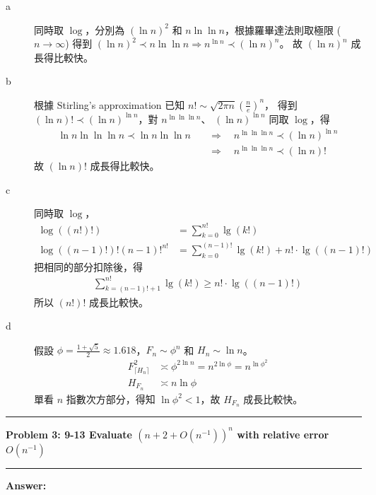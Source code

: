 \documentclass[11pt,fleqn]{article}
\newcommand\question[2]{\vspace{.25in}\hrule\textbf{#1: #2}\vspace{.5em}\hrule\vspace{.10in}}
\renewcommand\part[1]{\vspace{.10in}\textbf{#1}}
\begin{document}
\begin{description}
	\item[a] 同時取 $\log$，分別為 $(\ln n)^2$ 和 $n \ln \ln n$，根據羅畢達法則取極限 
		($n \rightarrow \infty$) 得到 
		$(\ln n)^2 \prec n \ln \ln n \Rightarrow n^{\ln n} \prec (\ln n)^n$。
		故 $(\ln n)^n$ 成長得比較快。
	\item[b] 根據 Stirling's approximation 已知 
		$n! \sim \sqrt{2 \pi n} \left(\frac{n}{e}\right)^n$，
		得到 $(\ln n)! \prec (\ln n)^{\ln n}$，對 $n^{\ln \ln \ln n}$、
		$(\ln n)^{\ln n}$ 同取 $\log$，得 
		\begin{align*}
			\ln n \ln \ln \ln n \prec \ln n \ln \ln n
				\quad &\Rightarrow \quad
			n^{\ln \ln \ln n} \prec (\ln n)^{\ln n} \\
			&\Rightarrow \quad
			n^{\ln \ln \ln n} \prec (\ln n)!
		\end{align*}
		故 $(\ln n)!$ 成長得比較快。
	\item[c] 同時取 $\log$，
		\begin{align*}
			\log ((n!)!) 
				&= \sum\nolimits_{k=0}^{n!} \lg (k!) \\
			\log ((n-1)!)! (n-1)!^{n!} 
				&= \sum\nolimits_{k=0}^{(n-1)!} \lg (k!) + n! \cdot \lg ((n-1)!)
		\end{align*}
		把相同的部分扣除後，得
		\begin{align*}
			\sum\nolimits_{k=(n-1)!+1}^{n!} \lg (k!) \ge n! \cdot \lg ((n-1)!)
		\end{align*}
		所以 $(n!)!$ 成長比較快。
	\item[d] 假設 $\phi = \frac{1 + \sqrt{5}}{2} \approx 1.618$，$F_n \sim \phi^n$ 
		和 $H_n \sim \ln n$。
		\begin{align*}
			F^2_{\lceil H_n \rceil} &
				\asymp \phi^{2 \ln n} = n^{2 \ln \phi} = n^{\ln \phi^2} \\
			H_{F_n} &
				\asymp n \ln \phi
		\end{align*}
		單看 $n$ 指數次方部分，得知 $\ln \phi^2 < 1$，故 $H_{F_n}$ 成長比較快。
\end{description}

\newpage

\question{Problem 3} {9-13 Evaluate $(n + 2 + O(n^{-1}))^n$ with relative 
	error $O(n^{-1})$
}

\part{Answer:}
\end{document}
